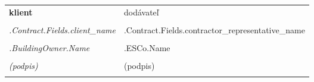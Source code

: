 
\mbox{}\vfill %
\begin{tabu}{X X} \tabucline{}
	\rowfont[c]\bfseries klient & dodávateľ \\
	[10pt]\makebox[8cm]{\hrulefill} & \makebox[8cm]{\hrulefill} \\
	\rowfont[c]\itshape {{.Contract.Fields.client_name}} & {{.Contract.Fields.contractor_representative_name}} \\
	[10pt]\makebox[8cm]{\hrulefill} & \makebox[8cm]{\hrulefill} \\
	\rowfont[c]\itshape {{.BuildingOwner.Name}} & {{.ESCo.Name}} \\
	[10pt]\makebox[8cm]{\hrulefill} & \makebox[8cm]{\hrulefill} \\
	\rowfont[c]\itshape (podpis) & (podpis) \\[4cm] \\
\end{tabu}
\pagebreak
